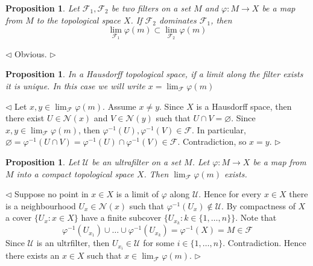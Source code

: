 \documentclass[12pt]{article}
\newtheorem{proposition}[theorem]{Proposition}
\newenvironment{proof}{\par $\triangleleft$}{$\triangleright$}
\begin{document}
\begin{proposition}\label{PrChangeOfFilterInLimit} Let $\mathcal{F}_1,
        \mathcal{F}_2$ be two filters on a set $M$ and $\varphi:M\to X$ be a map
    from $M$ to the topological space $X$. If $\mathcal{F}_2$ dominates
    $\mathcal{F}_1$, then
    $$
        \lim_{\mathcal{F}_1}\varphi(m)\subset\lim_{\mathcal{F}_2}\varphi(m)
    $$
\end{proposition}
\begin{proof} Obvious.
\end{proof}

\begin{proposition}\label{RemUniqueLimitAlongFilter} In a Hausdorff topological
    space, if a limit along the filter exists it is unique. In this case we will
    write $x=\lim_{\mathcal{F}}\varphi(m)$
\end{proposition}
\begin{proof} Let $x,y\in\lim_{\mathcal{F}}\varphi(m)$. Assume $x\neq y$. Since
    $X$ is a Hausdorff space, then there exist $U\in\mathcal{N}(x)$ and
    $V\in\mathcal{N}(y)$ such that $U\cap V=\varnothing$. Since
    $x,y\in\lim_{\mathcal{F}}\varphi(m)$, then
    $\varphi^{-1}(U),\varphi^{-1}(V)\in\mathcal{F}$. In particular,
    $\varnothing=\varphi^{-1}(U\cap
        V)=\varphi^{-1}(U)\cap\varphi^{-1}(V)\in\mathcal{F}$. Contradiction, so
    $x=y$.
\end{proof}

\begin{proposition}\label{PrLimitAlongUltrafilterIntoTheCompact} Let
    $\mathcal{U}$ be an ultrafilter on a set $M$. Let $\varphi:M\to X$ be a map
    from $M$ into a compact topological space $X$. Then
    $\lim_{\mathcal{F}}\varphi(m)$ exists.
\end{proposition}
\begin{proof} Suppose no point in $x\in X$ is a limit of $\varphi$ along
    $\mathcal{U}$. Hence for every $x\in X$ there is a neighbourhood
    $U_x\in\mathcal{N}(x)$ such that $\varphi^{-1}(U_x)\notin\mathcal{U}$. By
    compactness of $X$ a cover $\{U_x:x\in X\}$ have a finite subcover
    $\{U_{x_k}:k\in \{1,\ldots,n\} \}$. Note that
    $$
        \varphi^{-1}(U_{x_1})\cup\ldots\cup\varphi^{-1}(U_{x_k})
        =\varphi^{-1}(X)=M\in\mathcal{F}
    $$
    Since $\mathcal{U}$ is an ultrfilter, then $U_{x_i}\in\mathcal{U}$ for some
    $i\in \{1,\ldots,n\}$. Contradiction. Hence there exists an $x\in X$ such
    that $x\in\lim_{\mathcal{F}}\varphi(m)$.
\end{proof}
\end{document}
